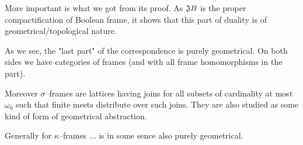 More important is what we got from its proof. As $\mathfrak{J} B$ is the proper compactification of Boolean frame, it shows that this part of duality is of geometrical/topological nature.

\dotfill

As we see, the "last part" of the correspondence is purely geometrical. On both sides we have categories of frames (and with all frame homomorphisms in the \Bool{} part).

Moreover $\sigma$--frames are lattices having joins for all subsets of cardinality at most $\omega_0$ such that finite meets distribute over such joins.
They are also studied as some kind of form of geometrical abstraction.

Generally for $\kappa$--frames ... is in some sence also purely geometrical.
